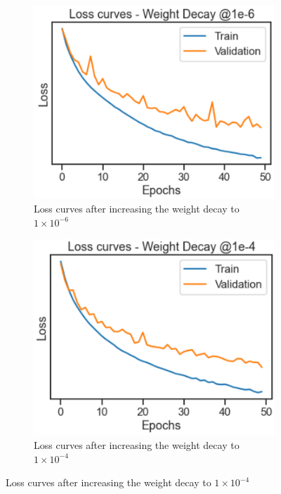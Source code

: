 \documentclass[a4paper, 12pt]{article}
\begin{document}
\begin{figure}[H]
\begin{subfigure}{.5\textwidth}
    \centering
    \includegraphics[width=1\textwidth, scale = 0.1]{Weightdecay0.PNG}
    \caption{Loss curves after increasing the weight decay to $1 \times 10^{-6}$}
    \label{fig:wd0}
\end{subfigure} \hfill
\begin{subfigure}{.4\textwidth}
    \centering
    \includegraphics[width=1.1\textwidth, scale = 0.2]{Weightdecay1.PNG}
    \caption{Loss curves after increasing the weight decay to $1 \times 10^{-4}$}

\end{subfigure}
\end{figure}
\end{document}

